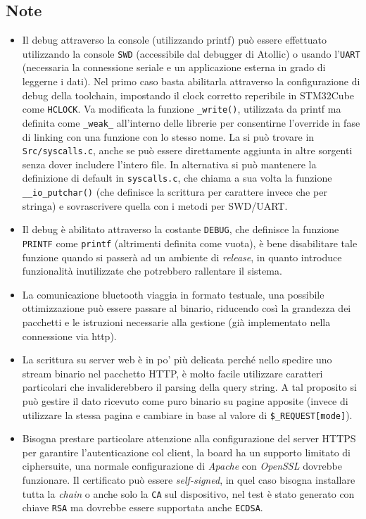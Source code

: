 \newpage

\subsection{Note}
\begin{itemize}
  \item Il debug attraverso la console (utilizzando printf) pu\`o essere effettuato utilizzando la console \texttt{SWD} (accessibile dal debugger di Atollic) o usando l'\texttt{UART} (necessaria la connessione seriale e un applicazione esterna in grado di leggerne i dati). Nel primo caso basta abilitarla attraverso la configurazione di debug della toolchain, impostando il clock corretto reperibile in STM32Cube come \texttt{HCLOCK}. Va modificata la funzione \texttt{\_write()}, utilizzata da printf ma definita come \texttt{\_weak\_} all'interno delle librerie per consentirne l'override in fase di linking con una funzione con lo stesso nome. La si pu\`o trovare in \texttt{Src/syscalls.c}, anche se pu\`o essere direttamente aggiunta in altre sorgenti senza dover includere l'intero file. In alternativa si pu\`o mantenere la definizione di default in \texttt{syscalls.c}, che chiama a sua volta la funzione \texttt{\_\_io\_putchar()} (che definisce la scrittura per carattere invece che per stringa) e sovrascrivere quella con i metodi per SWD/UART.
  \item Il debug \`e abilitato attraverso la costante \texttt{DEBUG}, che definisce la funzione \texttt{PRINTF} come \texttt{printf} (altrimenti definita come vuota), \`e bene disabilitare tale funzione quando si passer\`a ad un ambiente di \textit{release}, in quanto introduce funzionalit\`a inutilizzate che potrebbero rallentare il sistema.
  \item La comunicazione bluetooth viaggia in formato testuale, una possibile ottimizzazione pu\`o essere passare al binario, riducendo cos\`i la grandezza dei pacchetti e le istruzioni necessarie alla gestione (gi\`a implementato nella connessione via http).
  \item La scrittura su server web \`e in po' pi\`u delicata perch\'e nello spedire uno stream binario nel pacchetto HTTP, \`e molto facile utilizzare caratteri particolari che invaliderebbero il parsing della query string. A tal proposito si pu\`o gestire il dato ricevuto come puro binario su pagine apposite (invece di utilizzare la stessa pagina e cambiare in base al valore di \texttt{\$\_REQUEST[mode]}).
  \item Bisogna prestare particolare attenzione alla configurazione del server HTTPS per garantire l'autenticazione col client, la board ha un supporto limitato di ciphersuite, una normale configurazione di \textit{Apache} con \textit{OpenSSL} dovrebbe funzionare. Il certificato pu\`o essere \textit{self-signed}, in quel caso bisogna installare tutta la \textit{chain} o anche solo la \texttt{CA} sul dispositivo, nel test \`e stato generato con chiave \texttt{RSA} ma dovrebbe essere supportata anche \texttt{ECDSA}.

\end{itemize}
